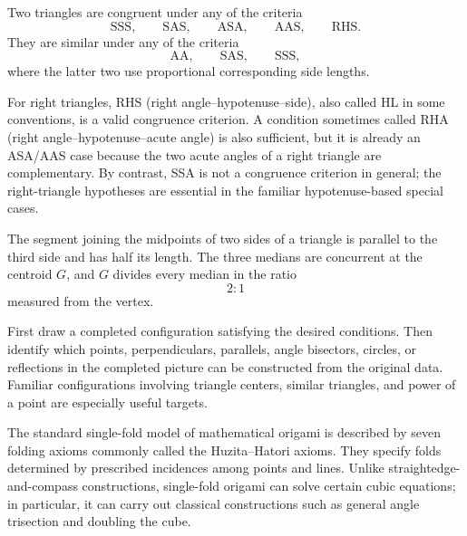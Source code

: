     \begin{proposition}
        Two triangles are congruent under any of the criteria
        \[
            \mathrm{SSS},\qquad \mathrm{SAS},\qquad \mathrm{ASA},
            \qquad \mathrm{AAS},\qquad \mathrm{RHS}.
        \]
        They are similar under any of the criteria
        \[
            \mathrm{AA},\qquad \mathrm{SAS},\qquad \mathrm{SSS},
        \]
        where the latter two use proportional corresponding side lengths.
    \end{proposition}


    \begin{remark}
        For right triangles, RHS (right angle--hypotenuse--side), also called
        HL in some conventions, is a valid congruence criterion. A condition
        sometimes called RHA (right angle--hypotenuse--acute angle) is also
        sufficient, but it is already an ASA/AAS case because the two acute
        angles of a right triangle are complementary. By contrast, SSA is not
        a congruence criterion in general; the right-triangle hypotheses are
        essential in the familiar hypotenuse-based special cases.
    \end{remark}

    \begin{theorem}
        The segment joining the midpoints of two sides of a triangle is parallel
        to the third side and has half its length. The three medians are
        concurrent at the centroid $G$, and $G$ divides every median in the ratio
        \[
            2:1
        \]
        measured from the vertex.
    \end{theorem}

    \begin{strategy}
        First draw a completed configuration satisfying the desired conditions.
        Then identify which points, perpendiculars, parallels, angle bisectors,
        circles, or reflections in the completed picture can be constructed from
        the original data. Familiar configurations involving triangle centers,
        similar triangles, and power of a point are especially useful targets.
    \end{strategy}


    \begin{fact}
        The standard single-fold model of mathematical origami is described by
        seven folding axioms commonly called the Huzita--Hatori axioms. They
        specify folds determined by prescribed incidences among points and
        lines. Unlike straightedge-and-compass constructions, single-fold
        origami can solve certain cubic equations; in particular, it can carry
        out classical constructions such as general angle trisection and
        doubling the cube.
    \end{fact}

